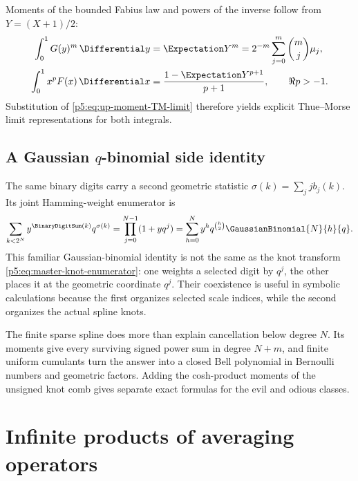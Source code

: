 \documentclass[11pt]{article}
\theoremstyle{definition}
\theoremstyle{remark}
\begin{document}
Moments of the bounded Fabius law and powers of the inverse follow from
$Y=(X+1)/2$:
\begin{align}
 \int_0^1G(y)^m\,\Differential y
 &=\Expectation Y^m
 =2^{-m}\sum_{j=0}^m\binom mj\mu_j,                       \label{p5:eq:G-moment-up}\\
 \int_0^1x^pF(x)\,\Differential x
 &=\frac{1-\Expectation Y^{p+1}}{p+1},\qquad \Re p>-1.              \label{p5:eq:F-Mellin-moment}
\end{align}
Substitution of \eqref{p5:eq:up-moment-TM-limit} therefore yields explicit
Thue--Morse limit representations for both integrals.

\subsection{A Gaussian \texorpdfstring{$q$}{q}-binomial side identity}

The same binary digits carry a second geometric statistic
$\sigma(k)=\sum_jjb_j(k)$.  Its joint Hamming-weight enumerator is
\begin{equation}
 \sum_{k<2^N}y^{\BinaryDigitSum(k)}q^{\sigma(k)}
 =\prod_{j=0}^{N-1}(1+yq^j)
 =\sum_{h=0}^{N}y^hq^{\binom h2}\GaussianBinomial{N}{h}{q}.               \label{p5:eq:qbinomial-digit-enumerator}
\end{equation}
This familiar Gaussian-binomial identity is not the same as the knot transform
\eqref{p5:eq:master-knot-enumerator}: one weights a selected digit by $q^j$, the
other places it at the geometric coordinate $q^j$.  Their coexistence is useful
in symbolic calculations because the first organizes selected scale indices,
while the second organizes the actual spline knots.

\begin{resultboxPartiv}
The finite sparse spline does more than explain cancellation below degree $N$.
Its moments give every surviving signed power sum in degree $N+m$, and finite
uniform cumulants turn the answer into a closed Bell polynomial in Bernoulli
numbers and geometric factors.  Adding the cosh-product moments of the unsigned
knot comb gives separate exact formulas for the evil and odious classes.
\end{resultboxPartiv}

\section{Infinite products of averaging operators}
\label{p5:sec:operators}
\end{document}
